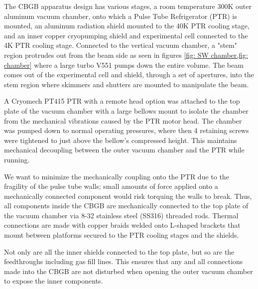 The CBGB apparatus design has various stages, a room temperature 300K outer aluminum vacuum chamber, onto which a Pulse Tube Refrigerator (PTR) is mounted, an aluminum radiation shield mounted to the 40K PTR cooling stage, and an inner copper cryopumping shield and experimental cell connected to the 4K PTR cooling stage. Connected to the vertical vacuum chamber, a "stem" region protrudes out from the beam side as seen in figures \cref{fig: SW chamber,fig: chamber} where a large turbo V551 pumps down the entire volume. The beam comes out of the experimental cell and shield, through a set of apertures, into the stem region where skimmers and shutters are mounted to manipulate the beam.

A Cryomech PT415 PTR with a remote head option was attached to the top plate of the vacuum chamber with a large bellows mount to isolate the chamber from the mechanical vibrations caused by the PTR motor head. The chamber was pumped down to normal operating pressures, where then 4 retaining screws were tightened to just above the bellow's compressed height. This maintains mechanical decoupling between the outer vacuum chamber and the PTR while running.

We want to minimize the mechanically coupling onto the PTR due to the fragility of the pulse tube walls; small amounts of force applied onto a mechanically connected component would risk torquing the walls to break. Thus, all components inside the CBGB are mechanically connected to the top plate of the vacuum chamber via 8-32 stainless steel (SS316) threaded rods. Thermal connections are made with copper braids welded onto L-shaped brackets that mount between platforms secured to the PTR cooling stages and the shields.

Not only are all the inner shields connected to the top plate, but so are the feedthroughs including gas fill lines. This ensures that any and all connections made into the CBGB are not disturbed when opening the outer vacuum chamber to expose the inner components.

